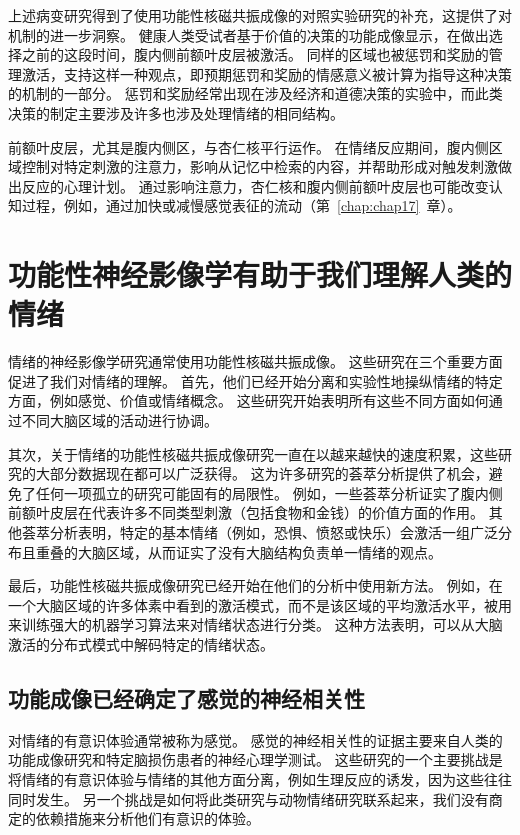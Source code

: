 上述病变研究得到了使用功能性核磁共振成像的对照实验研究的补充，这提供了对机制的进一步洞察。
健康人类受试者基于价值的决策的功能成像显示，在做出选择之前的这段时间，腹内侧前额叶皮层被激活。
同样的区域也被惩罚和奖励的管理激活，支持这样一种观点，即预期惩罚和奖励的情感意义被计算为指导这种决策的机制的一部分。
惩罚和奖励经常出现在涉及经济和道德决策的实验中，而此类决策的制定主要涉及许多也涉及处理情绪的相同结构。


前额叶皮层，尤其是腹内侧区，与杏仁核平行运作。
在情绪反应期间，腹内侧区域控制对特定刺激的注意力，影响从记忆中检索的内容，并帮助形成对触发刺激做出反应的心理计划。
通过影响注意力，杏仁核和腹内侧前额叶皮层也可能改变认知过程，例如，通过加快或减慢感觉表征的流动（第~\ref{chap:chap17}~章）。



\section{功能性神经影像学有助于我们理解人类的情绪}

情绪的神经影像学研究通常使用功能性核磁共振成像。 这些研究在三个重要方面促进了我们对情绪的理解。
首先，他们已经开始分离和实验性地操纵情绪的特定方面，例如感觉、价值或情绪概念。
这些研究开始表明所有这些不同方面如何通过不同大脑区域的活动进行协调。


其次，关于情绪的功能性核磁共振成像研究一直在以越来越快的速度积累，这些研究的大部分数据现在都可以广泛获得。
这为许多研究的荟萃分析提供了机会，避免了任何一项孤立的研究可能固有的局限性。
例如，一些荟萃分析证实了腹内侧前额叶皮层在代表许多不同类型刺激（包括食物和金钱）的价值方面的作用。
其他荟萃分析表明，特定的基本情绪（例如，恐惧、愤怒或快乐）会激活一组广泛分布且重叠的大脑区域，从而证实了没有大脑结构负责单一情绪的观点。


最后，功能性核磁共振成像研究已经开始在他们的分析中使用新方法。
例如，在一个大脑区域的许多体素中看到的激活模式，而不是该区域的平均激活水平，被用来训练强大的机器学习算法来对情绪状态进行分类。
这种方法表明，可以从大脑激活的分布式模式中解码特定的情绪状态。



\subsection{功能成像已经确定了感觉的神经相关性}

对情绪的有意识体验通常被称为感觉。
感觉的神经相关性的证据主要来自人类的功能成像研究和特定脑损伤患者的神经心理学测试。
这些研究的一个主要挑战是将情绪的有意识体验与情绪的其他方面分离，例如生理反应的诱发，因为这些往往同时发生。
另一个挑战是如何将此类研究与动物情绪研究联系起来，我们没有商定的依赖措施来分析他们有意识的体验。


